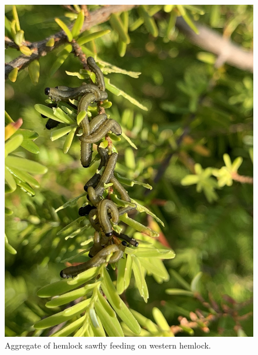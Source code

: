 \begin{figure}[H]
\begin{center}
\vspace{2mm}
\includegraphics[width=\textwidth]{img/hemlock_sawfly_larvae.jpg}
\caption{Aggregate of hemlock sawfly feeding on western hemlock.}
\label{hemlock_sawfly_larvae}
\end{center}
\end{figure}

